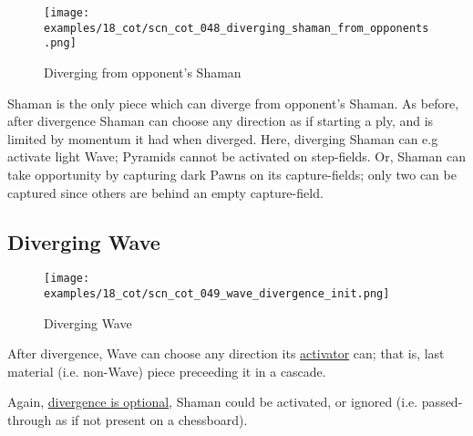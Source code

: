 \vspace*{-1.4\baselineskip}
\noindent
\begin{figure}[!h]
\texttt{[image: examples/18\_cot/scn\_cot\_048\_diverging\_shaman\_from\_opponents.png]}
\vspace*{-1.3\baselineskip}
\caption{Diverging from opponent's Shaman}
\label{fig:scn_cot_048_diverging_shaman_from_opponents}
\end{figure}

\vspace*{-0.5\baselineskip}
Shaman is the only piece which can diverge from opponent's Shaman. As before, after
divergence Shaman can choose any direction as if starting a ply, and is limited by
momentum it had when diverged. %
Here, diverging Shaman can e.g activate light Wave; Pyramids cannot be activated
on step-fields. Or, Shaman can take opportunity by capturing dark Pawns on its
capture-fields; only two can be captured since others are behind an empty
capture-field.

\clearpage %

\subsection*{Diverging Wave}
\label{sec:Conquest of Tlalocan/Divergence/Diverging Wave}

\vspace*{-1.4\baselineskip}
\noindent
\begin{figure}[!h]
\texttt{[image: examples/18\_cot/scn\_cot\_049\_wave\_divergence\_init.png]}
\vspace*{-1.3\baselineskip}
\caption{Diverging Wave}
\label{fig:scn_cot_049_wave_divergence_init}
\end{figure}

\vspace*{-0.4\baselineskip}
After divergence, Wave can choose any direction its
\hyperref[fig:scn_mv_29_wave_cascading_steps]{activator} can; that is, last material
(i.e. non-Wave) piece preceeding it in a cascade.

Again, \hyperref[fig:scn_cot_030_own_shaman_is_divergent_init]{divergence is optional},
Shaman could be activated, or ignored (i.e. passed-through as if not present on a
chessboard).

